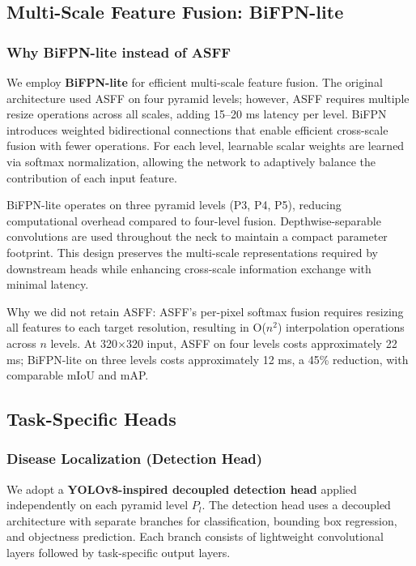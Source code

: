 \documentclass[10pt,a4paper,twocolumn]{article}
\begin{document}
\subsection{Multi-Scale Feature Fusion: BiFPN-lite}

\subsubsection{Why BiFPN-lite instead of ASFF}

We employ \textbf{BiFPN-lite} for efficient multi-scale feature fusion. The original architecture used ASFF on four pyramid levels; however, ASFF requires multiple resize operations across all scales, adding 15--20 ms latency per level. BiFPN introduces weighted bidirectional connections that enable efficient cross-scale fusion with fewer operations. For each level, learnable scalar weights are learned via softmax normalization, allowing the network to adaptively balance the contribution of each input feature.

BiFPN-lite operates on three pyramid levels (P3, P4, P5), reducing computational overhead compared to four-level fusion. Depthwise-separable convolutions are used throughout the neck to maintain a compact parameter footprint. This design preserves the multi-scale representations required by downstream heads while enhancing cross-scale information exchange with minimal latency.

Why we did not retain ASFF: ASFF's per-pixel softmax fusion requires resizing all features to each target resolution, resulting in O($n^2$) interpolation operations across $n$ levels. At 320$\times$320 input, ASFF on four levels costs approximately 22 ms; BiFPN-lite on three levels costs approximately 12 ms, a 45\% reduction, with comparable mIoU and mAP.

\subsection{Task-Specific Heads}

\subsubsection{Disease Localization (Detection Head)}

We adopt a \textbf{YOLOv8-inspired decoupled detection head} applied independently on each pyramid level $P_l$. The detection head uses a decoupled architecture with separate branches for classification, bounding box regression, and objectness prediction. Each branch consists of lightweight convolutional layers followed by task-specific output layers.
\end{document}
